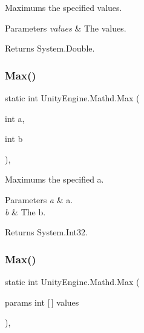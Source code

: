 Maximums the specified values. 


\begin{DoxyParams}{Parameters}
{\em values} & The values.\\
\hline
\end{DoxyParams}
\begin{DoxyReturn}{Returns}
System.\+Double.
\end{DoxyReturn}
\mbox{\label{struct_unity_engine_1_1_mathd_ac3a242dc16f7b50b609cb03110e9be2a}} 
\subsubsection{\texorpdfstring{Max()}{Max()}\hspace{0.1cm}{\footnotesize\ttfamily [3/4]}}
{\footnotesize\ttfamily static int Unity\+Engine.\+Mathd.\+Max (\begin{DoxyParamCaption}\item[{int}]{a,  }\item[{int}]{b }\end{DoxyParamCaption})\hspace{0.3cm}{\ttfamily [inline]}, {\ttfamily [static]}}



Maximums the specified a. 


\begin{DoxyParams}{Parameters}
{\em a} & a.\\
\hline
{\em b} & The b.\\
\hline
\end{DoxyParams}
\begin{DoxyReturn}{Returns}
System.\+Int32.
\end{DoxyReturn}
\mbox{\label{struct_unity_engine_1_1_mathd_ab382aa0367934caaa4893e524e574be5}} 
\subsubsection{\texorpdfstring{Max()}{Max()}\hspace{0.1cm}{\footnotesize\ttfamily [4/4]}}
{\footnotesize\ttfamily static int Unity\+Engine.\+Mathd.\+Max (\begin{DoxyParamCaption}\item[{params int \mbox{[}$\,$\mbox{]}}]{values }\end{DoxyParamCaption})\hspace{0.3cm}{\ttfamily [inline]}, {\ttfamily [static]}}



